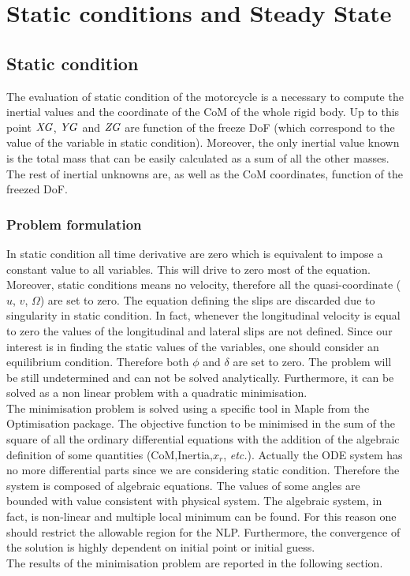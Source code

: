 \chapter{Static conditions and Steady State}
\label{Ch:SS}
%
\section{Static condition}
%
The evaluation of static condition of the motorcycle is a necessary to compute the inertial values and the coordinate of the CoM of the whole rigid body. Up to this point ${\it XG}$, ${\it YG}$ and ${\it ZG}$ are function of the freeze DoF (which correspond to the value of the variable in static condition). Moreover, the only inertial value known is the total mass that can be easily calculated as a sum of all the other masses. The rest of inertial unknowns are, as well as the CoM coordinates, function of the freezed DoF.  
%
\subsection{Problem formulation}
%
In static condition all time derivative are zero which is equivalent to impose a constant value to all variables. This will drive to zero most of the equation. Moreover, static conditions means no velocity, therefore all the quasi-coordinate ($u$, $v$, $\Omega$) are set to zero. The equation defining the slips are discarded due to singularity in static condition. In fact, whenever the longitudinal velocity is equal to zero the values of the longitudinal and lateral slips are not defined. Since our interest is in finding the static values of the variables, one should consider an equilibrium condition. Therefore both $\phi$ and $\delta$ are set to zero. The problem will be still undetermined and can not be solved analytically. Furthermore, it can be solved as a non linear problem with a quadratic minimisation.\\
The minimisation problem is solved using a specific tool in Maple from the Optimisation package.
The objective function to be minimised in the sum of the square of all the ordinary differential equations with the addition of the algebraic definition of some quantities (CoM,Inertia,$x_r$, \textit{etc.}). Actually the ODE system has no more differential parts since we are considering static condition. Therefore the system is composed of algebraic equations. The values of some angles are bounded with value consistent with physical system. The algebraic system, in fact, is non-linear and multiple local minimum can be found. For this reason one should restrict the allowable region for the NLP. Furthermore, the convergence of the solution is highly dependent on initial point or initial guess.\\
The results of the minimisation problem are reported in the following section.
%
